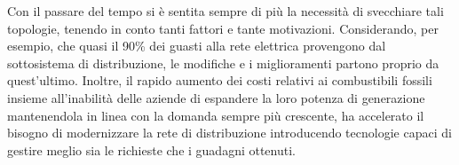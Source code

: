 Con il passare del tempo si è sentita sempre di più la necessità di svecchiare tali topologie, tenendo in conto tanti fattori e tante motivazioni.\newline
Considerando, per esempio, che quasi il 90\% dei guasti alla rete elettrica provengono dal sottosistema di distribuzione, le modifiche e i miglioramenti partono proprio da quest'ultimo. Inoltre, il rapido aumento dei costi relativi ai combustibili fossili insieme all'inabilità delle aziende di espandere la loro potenza di generazione mantenendola in linea con la domanda sempre più crescente, ha accelerato il bisogno di modernizzare la rete di distribuzione introducendo tecnologie capaci di gestire meglio sia le richieste che i guadagni ottenuti. \newline
\begin{figure}[h]
\end{figure}

